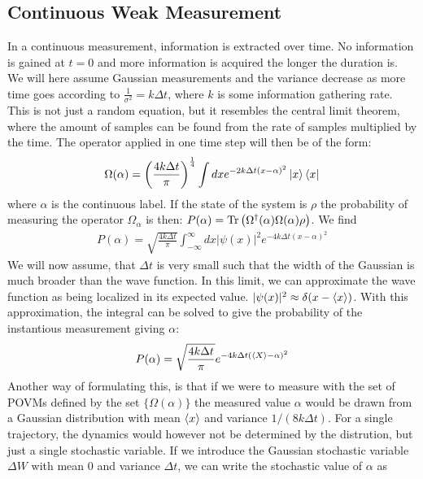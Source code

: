 \subsection{Continuous Weak Measurement}\label{sec:continuous_weak_measurement}
In a continuous measurement, information is extracted over time. No information is gained at $t=0$ and more information is acquired the longer the duration is. We will here assume Gaussian measurements and the variance decrease as more time goes according to $\frac{1}{\sigma^2} = k \Delta t$, where $k$ is some information gathering rate. This is not just a random equation, but it resembles the central limit theorem, where the amount of samples can be found from the rate of samples multiplied by the time. The operator applied in one time step will then be of the form:
\begin{equation}
    \Omega(\alpha) = \left(\frac{4 k \Delta t}{\pi}\right)^\frac14 \int dx e^{-2k\Delta t (x - \alpha)^2} \ket{x}\bra{x}
\end{equation}
where $\alpha$ is the continuous label. If the state of the system is $\rho$ the probability of measuring the operator $\Omega_\alpha$ is then: $P(\alpha) = \Tr\left(\Omega^\dagger(\alpha) \Omega(\alpha) \rho \right)$. We find %
\begin{align}
    P(\alpha) = \sqrt{\frac{4 k \Delta t}{\pi}} \int_{-\infty}^{\infty} dx |\psi(x)|^2 e^{-4k\Delta t (x - \alpha)^2}
\end{align}
We will now assume, that $\Delta t$ is very small such that the width of the Gaussian is much broader than the wave function. In this limit, we can approximate the wave function as being localized in its expected value. $|\psi(x)|^2 \approx \delta(x-\expval{x})$. With this approximation, the integral can be solved to give the probability of the instantious measurement giving $\alpha$:
\begin{equation}\label{eq:probability_of_alpha_gaussian}
    P(\alpha) = \sqrt{\frac{4 k \Delta t}{\pi}}  e^{-4k\Delta t (\expval{X} - \alpha)^2}
\end{equation}
Another way of formulating this, is that if we were to measure with the set of POVMs defined by the set $\{\Omega(\alpha)\}$ the measured value $\alpha$ would be drawn from a Gaussian distribution with mean $\expval{x}$ and variance $1 / (8k\Delta t)$. For a single trajectory, the dynamics would however not be determined by the distrution, but just a single stochastic variable. If we introduce the Gaussian stochastic variable $\Delta W$ with mean 0 and variance $\Delta t$, we can write the stochastic value of $\alpha$ as

